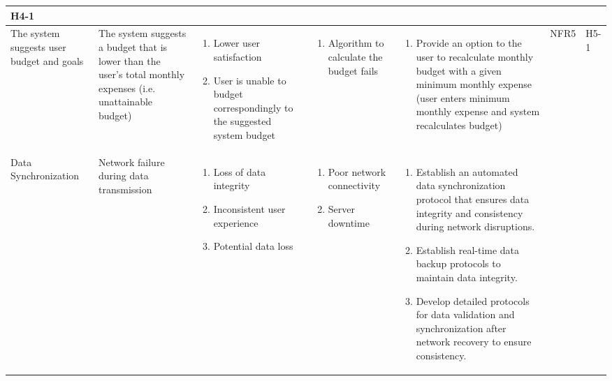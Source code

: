 \documentclass{article}
\begin{document}
\begin{landscape}
\begin{longtable}{|p{3cm}|p{4cm}|p{5cm}|p{5cm}|p{5cm}|p{1cm}|p{0.75cm}|}
    H4-1 \\
    \hline
    The system suggests user budget and goals &
    The system suggests a budget that is lower than the user's total monthly expenses (i.e. unattainable budget) &
    \begin{enumerate}[label=(\alph*), leftmargin=0.5cm]
        \item Lower user satisfaction
        \item User is unable to budget correspondingly to the suggested system budget 
    \end{enumerate} &
    \begin{enumerate}[label=(\alph*), leftmargin=0.5cm]
        \item Algorithm to calculate the budget fails 
    \end{enumerate} &
    \begin{enumerate}[label=(\alph*), leftmargin=0.5cm]
        \item Provide an option to the user to recalculate monthly budget with a given minimum monthly expense (user enters minimum monthly expense and system recalculates budget) 
    \end{enumerate} &
    NFR5 &
    H5-1\\
    \hline
    Data Synchronization &
    Network failure during data transmission &
    \begin{enumerate}[label=(\alph*), leftmargin=0.5cm]
        \item Loss of data integrity
        \item Inconsistent user experience
        \item Potential data loss
    \end{enumerate} &
    \begin{enumerate}[label=(\alph*), leftmargin=0.5cm]
        \item Poor network connectivity
        \item Server downtime
    \end{enumerate} &
    \begin{enumerate}[label=(\alph*), leftmargin=0.5cm]
        \item Establish an automated data synchronization protocol that ensures data integrity and consistency during network disruptions.
        \item Establish real-time data backup protocols to maintain data integrity.
        \item Develop detailed protocols for data validation and synchronization after network recovery to ensure consistency.

\end{enumerate}
\end{longtable}
\end{landscape}
\end{document}
